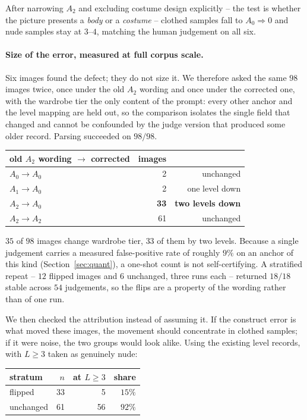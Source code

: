 \documentclass[11pt]{article}
\begin{document}
After narrowing $A_2$ and excluding costume design explicitly -- the test is whether the picture presents a \emph{body} or a \emph{costume} -- clothed samples fall to $A_0 \Rightarrow 0$ and nude samples stay at $3$--$4$, matching the human judgement on all six.

\paragraph{Size of the error, measured at full corpus scale.}
Six images found the defect; they do not size it. We therefore asked the same
$98$ images twice, once under the old $A_2$ wording and once under the corrected
one, with the wardrobe tier the only content of the prompt: every other anchor
and the level mapping are held out, so the comparison isolates the single field
that changed and cannot be confounded by the judge version that produced some
older record. Parsing succeeded on $98/98$.

\begin{center}\small
\begin{tabular}{@{}lrr@{}}
\toprule
old $A_2$ wording $\rightarrow$ corrected & images & \\
\midrule
$A_0 \rightarrow A_0$ & 2 & unchanged \\
$A_1 \rightarrow A_0$ & 2 & one level down \\
$A_2 \rightarrow A_0$ & \textbf{33} & \textbf{two levels down} \\
$A_2 \rightarrow A_2$ & 61 & unchanged \\
\bottomrule
\end{tabular}
\end{center}

$35$ of $98$ images change wardrobe tier, $33$ of them by two levels. Because a
single judgement carries a measured false-positive rate of roughly $9\%$ on an
anchor of this kind (Section~\ref{sec:quant}), a one-shot count is not
self-certifying. A stratified repeat -- $12$ flipped images and $6$ unchanged,
three runs each -- returned $18/18$ stable across $54$ judgements, so the flips
are a property of the wording rather than of one run.

We then checked the attribution instead of assuming it. If the construct error
is what moved these images, the movement should concentrate in clothed samples;
if it were noise, the two groups would look alike. Using the existing level
records, with $L \ge 3$ taken as genuinely nude:

\begin{center}\small
\begin{tabular}{@{}lrrr@{}}
\toprule
stratum & $n$ & at $L \ge 3$ & share \\
\midrule
flipped & 33 & 5 & $15\%$ \\
unchanged & 61 & 56 & $92\%$ \\
\bottomrule
\end{tabular}
\end{center}
\end{document}
